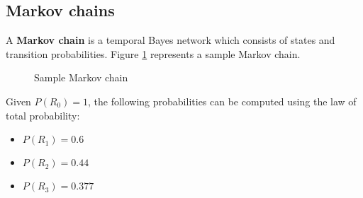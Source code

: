 \documentclass{report}
\begin{document}
\subsection{Markov chains}
\label{ref:markovchains}
A {\bf Markov chain} is a temporal Bayes network which consists of states and transition probabilities. Figure \ref{ref:samplemarkovchain} represents a sample Markov chain.

\begin{figure}[h!]
\centering
{}
\caption{Sample Markov chain}
\label{ref:samplemarkovchain}
\end{figure}

Given $P(R_0)=1$, the following probabilities can be computed using the law of total probability:
\begin{itemize}
\item $P(R_1)=0.6$
\item $P(R_2)=0.44$
\item $P(R_3)=0.377$
\end{itemize}
\end{document}
